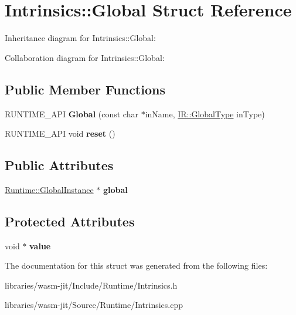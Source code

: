 \hypertarget{struct_intrinsics_1_1_global}{}\section{Intrinsics\+:\+:Global Struct Reference}
\label{struct_intrinsics_1_1_global}


Inheritance diagram for Intrinsics\+:\+:Global\+:


Collaboration diagram for Intrinsics\+:\+:Global\+:
\subsection*{Public Member Functions}
\begin{DoxyCompactItemize}
\item 
\mbox{\label{struct_intrinsics_1_1_global_a48ea777c15923c37452ec772ab5f568c}} 
R\+U\+N\+T\+I\+M\+E\+\_\+\+A\+PI {\bfseries Global} (const char $\ast$in\+Name, \mbox{\hyperlink{struct_i_r_1_1_global_type}{I\+R\+::\+Global\+Type}} in\+Type)
\item 
\mbox{\label{struct_intrinsics_1_1_global_a026909ebd700d16172eab915542d9c25}} 
R\+U\+N\+T\+I\+M\+E\+\_\+\+A\+PI void {\bfseries reset} ()
\end{DoxyCompactItemize}
\subsection*{Public Attributes}
\begin{DoxyCompactItemize}
\item 
\mbox{\label{struct_intrinsics_1_1_global_a1558d9706adb8b02b178d37136b02cf6}} 
\mbox{\hyperlink{struct_runtime_1_1_global_instance}{Runtime\+::\+Global\+Instance}} $\ast$ {\bfseries global}
\end{DoxyCompactItemize}
\subsection*{Protected Attributes}
\begin{DoxyCompactItemize}
\item 
\mbox{\label{struct_intrinsics_1_1_global_ab60caf0948149103dab22e266ff66d0c}} 
void $\ast$ {\bfseries value}
\end{DoxyCompactItemize}


The documentation for this struct was generated from the following files\+:\begin{DoxyCompactItemize}
\item 
libraries/wasm-\/jit/\+Include/\+Runtime/Intrinsics.\+h\item 
libraries/wasm-\/jit/\+Source/\+Runtime/Intrinsics.\+cpp\end{DoxyCompactItemize}
